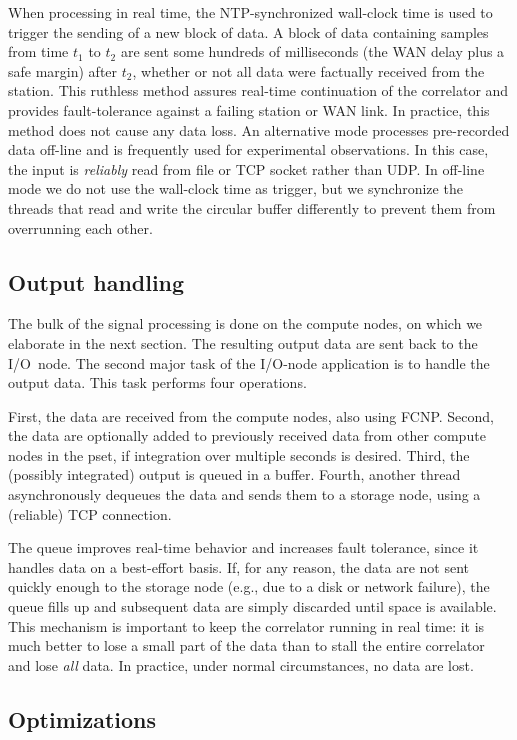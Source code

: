\documentclass[10pt]{article}
\begin{document}
When processing in real time, the NTP-synchronized wall-clock time
is used to trigger the sending of a new block of data.
A block of data containing samples from time $t_1$ to $t_2$ are sent some hundreds
of milliseconds (the WAN delay plus a safe margin) after $t_2$, whether or
not all data were factually received from the station.
This ruthless method assures real-time continuation of the correlator and
provides fault-tolerance against a failing station or WAN link.
In practice, this method does not cause any data loss.
An alternative mode processes pre-recorded data off-line and is frequently used
for experimental observations.
In this case, the input is \emph{reliably} read from file or TCP socket rather than
UDP.
In off-line mode we do not use the wall-clock time as
trigger, but we synchronize the threads that read and write the circular
buffer differently to prevent them from overrunning each other.


\subsection{Output handling}

The bulk of the signal processing is done on the compute nodes, on which we
elaborate in the next section.
The resulting output data are sent back to the I/O~node.
The second major task of the I/O-node application is to handle the output data.
This task performs four operations.

First, the data are received from the compute nodes, also using FCNP.
Second, the data are optionally added to previously received data from other
compute nodes in the pset, if integration over multiple seconds is desired.
Third, the (possibly integrated) output is queued in a buffer.
Fourth, another thread asynchronously dequeues the data and sends them to
a storage node, using a (reliable) TCP connection.

The queue improves real-time behavior and increases fault tolerance, since
it handles data on a best-effort basis.
If, for any reason, the data are not sent quickly enough to the storage node
(e.g., due to a disk or network failure), the queue fills up and subsequent
data are simply discarded until space is available.
This mechanism is important to keep the correlator running in real
time: it is much better to lose a small part of the data than to stall the
entire correlator and lose \emph{all\/} data.
In practice, under normal circumstances, no data are lost.


\subsection{Optimizations}
\end{document}
